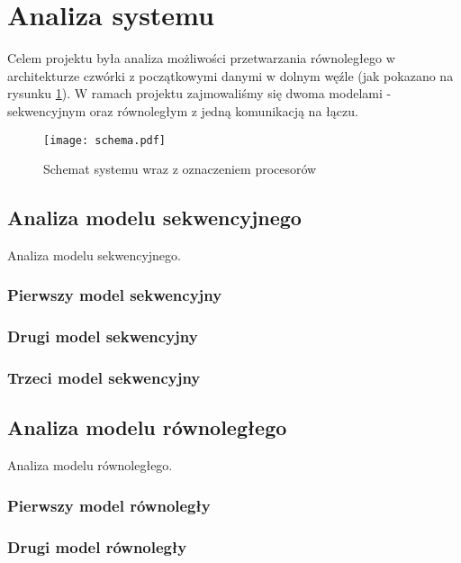
\section{Analiza systemu}

Celem projektu była analiza możliwości przetwarzania równoległego w architekturze czwórki z początkowymi danymi w dolnym węźle (jak pokazano na rysunku \ref{fig:schema}).
W ramach projektu zajmowaliśmy się dwoma modelami - sekwencyjnym oraz równoległym z jedną komunikacją na łączu.

\begin{figure}[!ht]
\centering
\texttt{[image: schema.pdf]}
\caption{Schemat systemu wraz z oznaczeniem procesorów}
\label{fig:schema}
\end{figure}

\subsection{Analiza modelu sekwencyjnego}

Analiza modelu sekwencyjnego.

\subsubsection{Pierwszy model sekwencyjny}

\subsubsection{Drugi model sekwencyjny}

\subsubsection{Trzeci model sekwencyjny}

\subsection{Analiza modelu równoległego}

Analiza modelu równoległego.

\subsubsection{Pierwszy model równoległy}

\subsubsection{Drugi model równoległy}

